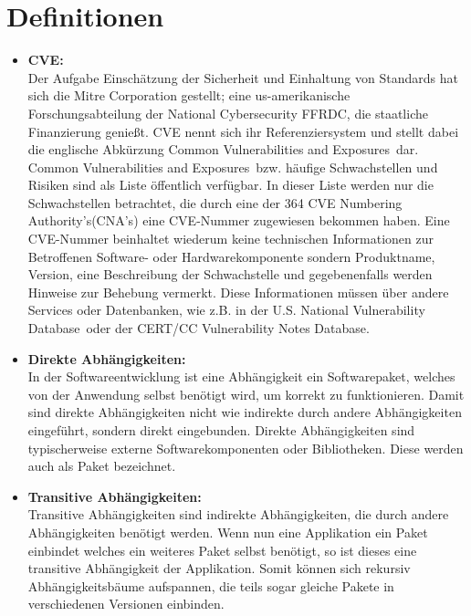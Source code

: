 \section{Definitionen} \label{sec:Definitionen}
\begin{itemize}
    \item \textbf{\ac{CVE}:} \\
    Der Aufgabe Einschätzung der Sicherheit und Einhaltung von Standards hat sich die Mitre Corporation\textsuperscript{\cite{link:MitreCve}} gestellt; eine us-amerikanische Forschungsabteilung der \glqq National Cybersecurity FFRDC\grqq, die staatliche Finanzierung genießt.
    \acs{CVE} nennt sich ihr Referenziersystem und stellt dabei die englische Abkürzung \glqq Common Vulnerabilities and Exposures\grqq~dar.
    \\
    \glqq Common Vulnerabilities and Exposures\grqq~bzw. häufige Schwachstellen und Risiken sind als Liste öffentlich verfügbar.
    In dieser Liste werden nur die Schwachstellen betrachtet, die durch eine der 364 \glqq \ac{CVE} Numbering Authority's\grqq (\acs{CNA}'s) eine \ac{CVE}-Nummer zugewiesen bekommen haben.\cite{link:CveOrgCnaS}
    Eine \ac{CVE}-Nummer beinhaltet wiederum keine technischen Informationen zur Betroffenen Software- oder Hardwarekomponente sondern Produktname, Version, eine Beschreibung der Schwachstelle und gegebenenfalls werden Hinweise zur Behebung vermerkt.
    Diese Informationen müssen über andere Services oder Datenbanken, wie z.B. in der \glqq U.S. National Vulnerability Database\grqq~oder der \glqq CERT/CC Vulnerability Notes Database\grqq.

    \item \textbf{Direkte Abhängigkeiten:} \\
    In der Softwareentwicklung ist eine Abhängigkeit ein Softwarepaket, welches von der Anwendung selbst benötigt wird, um korrekt zu funktionieren.
    Damit sind direkte Abhängigkeiten nicht wie indirekte durch andere Abhängigkeiten eingeführt, sondern direkt eingebunden.
    Direkte Abhängigkeiten sind typischerweise externe Softwarekomponenten oder Bibliotheken.
    Diese werden auch als Paket bezeichnet. 

    \item \textbf{Transitive Abhängigkeiten:} \\
    Transitive Abhängigkeiten sind indirekte Abhängigkeiten, die durch andere Abhängigkeiten benötigt werden.
    Wenn nun eine Applikation ein Paket einbindet welches ein weiteres Paket selbst benötigt, so ist dieses eine transitive Abhängigkeit der Applikation.
    Somit können sich rekursiv Abhängigkeitsbäume aufspannen, die teils sogar gleiche Pakete in verschiedenen Versionen einbinden.


\end{itemize}
